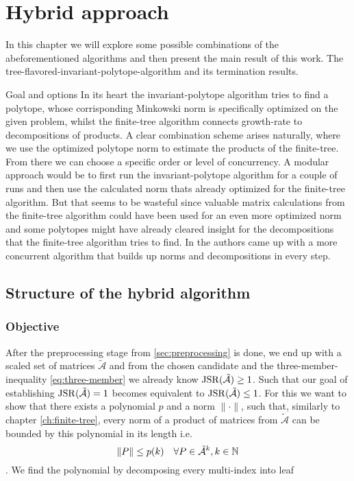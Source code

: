 
\chapter{Hybrid approach} 
\label{ch:hybrid}

In this chapter we will explore some possible combinations of the abeforementioned algorithms and then present the main result of this work. The tree-flavored-invariant-polytope-algorithm and its termination results. 

\begin{section}{Goal and options}
In its heart the invariant-polytope algorithm tries to find a polytope, whose corrisponding Minkowski norm is specifically optimized on the given problem, whilst the finite-tree algorithm connects growth-rate to decompositions of products. A clear combination scheme arises naturally, where we use the optimized polytope norm to estimate the products of the finite-tree. From there we can choose a specific order or level of concurrency.
\newline
A modular approach would be to first run the invariant-polytope algorithm for a couple of runs and then use the calculated norm thats already optimized for the finite-tree algorithm. But that seems to be wasteful since valuable matrix calculations from the finite-tree algorithm could have been used for an even more optimized norm and some polytopes might have already cleared insight for the decompositions that the finite-tree algorithm tries to find. In \citep{mejstrikHybridApproachJoint2024} the authors came up with a more concurrent algorithm that builds up norms and decompositions in every step. 
\end{section}

\section{Structure of the hybrid algorithm}

\subsection{Objective}
After the preprocessing stage from \ref{sec:preprocessing} is done, we end up with a scaled set of matrices $\tilde{\mathcal{A}}$ and from the chosen candidate and the three-member-inequality \eqref{eq:three-member} we already know $\operatorname{JSR}(\tilde{\mathcal{A}}) \geq 1$. 
Such that our goal of establishing $\operatorname{JSR}(\tilde{\mathcal{A}}) = 1$ becomes equivalent to  $\operatorname{JSR}(\tilde{\mathcal{A}}) \leq 1$. 
For this we want to show that there exists a polynomial $p$ and a norm $\lVert \cdot \rVert$, such that, similarly to chapter \ref{ch:finite-tree}, every norm of a product of matrices from $\tilde{\mathcal{A}}$ can be bounded by this polynomial in its length i.e. $$ \lVert P \rVert \leq p(k) \quad \forall P \in \tilde{\mathcal{A}}^k, k \in \mathbb{N} $$.
We find the polynomial by decomposing every multi-index into leaf 

